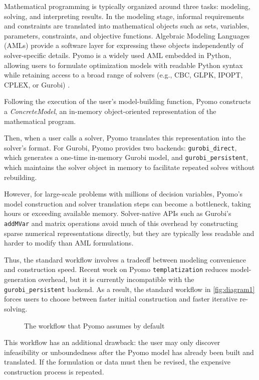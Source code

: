 \documentclass[runningheads]{llncs}
\begin{document}
Mathematical programming is typically organized around three tasks: modeling, solving, and interpreting results. In the modeling stage, informal requirements and constraints are translated into mathematical objects such as sets, variables, parameters, constraints, and objective functions. Algebraic Modeling Languages (AMLs) provide a software layer for expressing these objects independently of solver-specific details. Pyomo is a widely used AML embedded in Python, allowing users to formulate optimization models with readable Python syntax while retaining access to a broad range of solvers (e.g., CBC, GLPK, IPOPT, CPLEX, or Gurobi) \cite{hart2011pyomo,bynum2021pyomo}.

Following the execution of the user's model-building function, Pyomo constructs a \textit{ConcreteModel}, an in-memory object-oriented representation of the mathematical program.

Then, when a user calls a solver, Pyomo translates this representation into the solver's format. For Gurobi, Pyomo provides two backends: \texttt{gurobi\_direct}, which generates a one-time in-memory Gurobi model, and \texttt{gurobi\_persistent}, which maintains the solver object in memory to facilitate repeated solves without rebuilding. 

However, for large-scale problems with millions of decision variables, Pyomo’s model construction and solver translation steps can become a bottleneck, taking hours or exceeding available memory. Solver-native APIs such as Gurobi’s \texttt{addMVar} and matrix operations avoid much of this overhead by constructing sparse numerical representations directly, but they are typically less readable and harder to modify than AML formulations.

Thus, the standard workflow involves a tradeoff between modeling convenience and construction speed. Recent work on Pyomo \texttt{templatization} reduces model-generation overhead, but it is currently incompatible with the \texttt{gurobi\_persistent} backend. As a result, the standard workflow in \autoref{fig:diagram1} forces users to choose between faster initial construction and faster iterative re-solving.

\begin{figure}[H]
    \centering
    
    \caption{The workflow that Pyomo assumes by default}
    \label{fig:diagram1}
\end{figure}

This workflow has an additional drawback: the user may only discover infeasibility or unboundedness after the Pyomo model has already been built and translated. If the formulation or data must then be revised, the expensive construction process is repeated.
\end{document}
